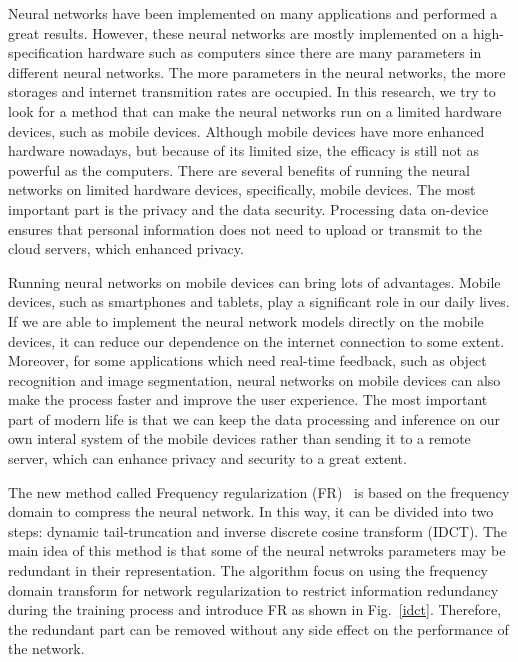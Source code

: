 \documentclass{article}
\begin{document}
Neural networks have been implemented on many applications and performed a great results. However, these neural networks are mostly implemented on a high-specification hardware such as computers since there are many parameters in different neural networks. The more parameters in the neural networks, the more storages and internet transmition rates are occupied. In this research, we try to look for a method that can make the neural networks run on a limited hardware devices, such as mobile devices. Although mobile devices have more enhanced hardware nowadays, but because of its limited size, the efficacy is still not as powerful as the computers. There are several benefits of running the neural networks on limited hardware devices, specifically, mobile devices. The most important part is the privacy and the data security. Processing data on-device ensures that personal information does not need to upload or transmit to the cloud servers, which enhanced privacy. 

Running neural networks on mobile devices can bring lots of advantages. Mobile devices, such as smartphones and tablets, play a significant role in our daily lives. If we are able to implement the neural network models directly on the mobile devices, it can reduce our dependence on the internet connection to some extent. Moreover, for some applications which need real-time feedback, such as object recognition and image segmentation, neural networks on mobile devices can also make the process faster and improve the user experience. The most important part of modern life is that we can keep the data processing and inference on our own interal system of the mobile devices rather than sending it to a remote server, which can enhance privacy and security to a great extent.

The new method called Frequency regularization (FR)~\cite{zhao2023frequency} is based on the frequency domain to compress the neural network. In this way, it can be divided into two steps: dynamic tail-truncation and inverse discrete cosine transform (IDCT). The main idea of this method is that some of the neural netwroks parameters may be redundant in their representation. The algorithm focus on using the frequency domain transform for network regularization to restrict information redundancy during the training process and introduce FR as shown in Fig.~\ref{idct}. Therefore, the redundant part can be removed without any side effect on the performance of the network.
\end{document}
